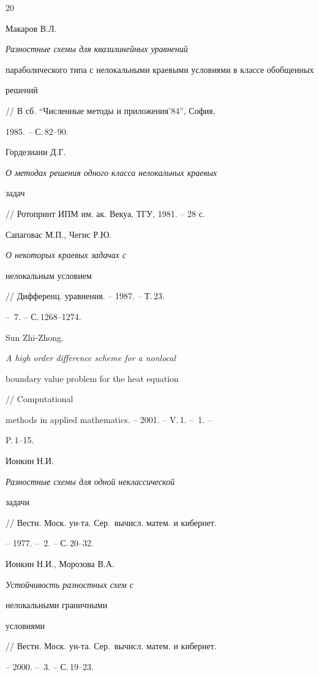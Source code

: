 \begin{thebibliography}{20}


Макаров В.Л. {\em Разностные схемы для квазилинейных уравнений 


параболического типа с нелокальными краевыми условиями в классе обобщенных


решений} // В сб. ``Численные методы и приложения'84'', София,


1985. -- С.\,82--90.







Гордезиани Д.Г. {\em О методах решения одного класса нелокальных краевых


задач} // Ротопринт ИПМ им. ак. Векуа, ТГУ, 1981. -- 28 с.







Сапаговас М.П., Чегис Р.Ю. {\em О некоторых краевых задачах с


нелокальным условием} // Дифференц. уравнения. -- 1987. -- Т.\,23.


-- \No\,7. -- С.\,1268--1274.







Sun Zhi-Zhong. {\em A high order difference scheme for a nonlocal


boundary value problem for the heat equation} // Computational


methods in applied mathematics. -- 2001. -- V.\,1. -- \No\,1. --


P.\,1--15.







Ионкин Н.И. {\em Разностные схемы для одной неклассической


задачи} // Вестн. Моск. ун-та. Сер.~вычисл. матем. и кибернет.


-- 1977. -- \No\,2. -- С.\,20--32.







Ионкин Н.И., Морозова В.А. {\em Устойчивость разностных схем с 


нелокальными граничными


условиями} // Вестн. Моск. ун-та. Сер.~вычисл. матем. и кибернет.


-- 2000. -- \No\,3. -- С.\,19--23.






\end{thebibliography}
